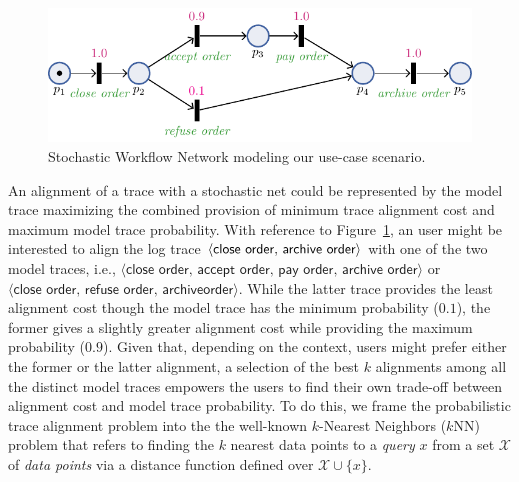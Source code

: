\begin{figure}[!t]
	\centering
	\includegraphics[width=.6\textwidth]{images/petri_tut.pdf}
	\caption{Stochastic Workflow Network modeling our use-case scenario.}\label{fig:petri_tut}
\end{figure}
An alignment of a trace with a stochastic net could be represented by the model trace maximizing the combined provision of minimum trace alignment cost and maximum model trace probability. With reference to Figure~\ref{fig:petri_tut}, an user might be interested to align the log trace $\braket{\textsf{close order},\,\textsf{archive order}}$ with one of the two model traces, i.e., $\langle\textsf{close order},\,\textsf{accept order},\,\textsf{pay order},\,\textsf{archive order}\rangle$ or $\langle\textsf{close order},\,\textsf{refuse order},\,\textsf{archive} \textsf{order}\rangle$. While the  latter trace provides the least alignment cost though the model trace has the minimum probability ($0.1$), the former gives a slightly greater alignment cost while providing the maximum probability ($0.9$). Given that, depending on the context, users might prefer either the former or the latter alignment, a selection of the best $k$ alignments among all the distinct model traces empowers the users to find their own trade-off between alignment cost and model trace probability.
To do this, we frame the probabilistic trace alignment problem into the the well-known $k$-Nearest Neighbors ($k$NN) problem \cite{Altman} that refers to finding the $k$ nearest data points to a \textit{query} $x$ from a set $\mathcal{X}$ of \textit{data points} via a distance function defined over $\mathcal{X}\cup\{x\}$.



